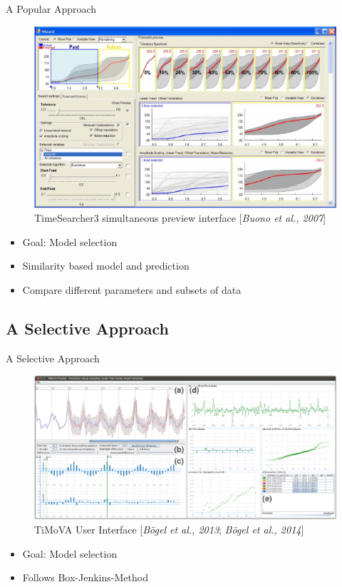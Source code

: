 \documentclass[10pt]{beamer}
\begin{document}
\begin{frame}{A Popular Approach}
	\centering
	\begin{figure}[htbp]
		\includegraphics[scale=.17]{images/TimeSearcher}
		\caption{TimeSearcher3 simultaneous preview interface [\textit{Buono et al., 2007}]}
	\end{figure}
	\begin{itemize}
		\item Goal: Model selection
		\item Similarity based model and prediction
		\item Compare different parameters and subsets of data 
	\end{itemize}
\end{frame}


\subsection{A Selective Approach}
\begin{frame}{A Selective Approach}
	\centering
	\begin{figure}[htbp]
		\includegraphics[scale=.17]{images/TiMoVA}
		\caption{TiMoVA User Interface [\textit{B\"ogel et al., 2013}; \textit{B\"ogel et al., 2014}]}
	\end{figure}
	\begin{itemize}
		\item Goal: Model selection
		\item Follows Box-Jenkins-Method
	\end{itemize}
\end{frame}
\end{document}
